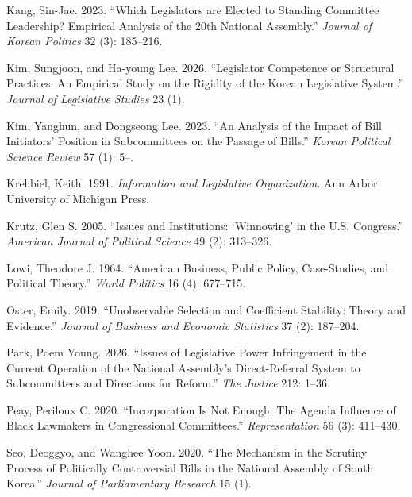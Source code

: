 \documentclass[11pt]{article}
\begin{document}
\begin{description}
\item Kang, Sin-Jae. 2023. ``Which Legislators are Elected to Standing Committee Leadership? Empirical Analysis of the 20th National Assembly.'' \textit{Journal of Korean Politics} 32 (3): 185--216.

\item Kim, Sungjoon, and Ha-young Lee. 2026. ``Legislator Competence or Structural Practices: An Empirical Study on the Rigidity of the Korean Legislative System.'' \textit{Journal of Legislative Studies} 23 (1).

\item Kim, Yanghun, and Dongseong Lee. 2023. ``An Analysis of the Impact of Bill Initiators' Position in Subcommittees on the Passage of Bills.'' \textit{Korean Political Science Review} 57 (1): 5--.

\item Krehbiel, Keith. 1991. \textit{Information and Legislative Organization}. Ann Arbor: University of Michigan Press.

\item Krutz, Glen S. 2005. ``Issues and Institutions: `Winnowing' in the U.S. Congress.'' \textit{American Journal of Political Science} 49 (2): 313--326.

\item Lowi, Theodore J. 1964. ``American Business, Public Policy, Case-Studies, and Political Theory.'' \textit{World Politics} 16 (4): 677--715.

\item Oster, Emily. 2019. ``Unobservable Selection and Coefficient Stability: Theory and Evidence.'' \textit{Journal of Business and Economic Statistics} 37 (2): 187--204.

\item Park, Poem Young. 2026. ``Issues of Legislative Power Infringement in the Current Operation of the National Assembly's Direct-Referral System to Subcommittees and Directions for Reform.'' \textit{The Justice} 212: 1--36.

\item Peay, Periloux C. 2020. ``Incorporation Is Not Enough: The Agenda Influence of Black Lawmakers in Congressional Committees.'' \textit{Representation} 56 (3): 411--430.

\item Seo, Deoggyo, and Wanghee Yoon. 2020. ``The Mechanism in the Scrutiny Process of Politically Controversial Bills in the National Assembly of South Korea.'' \textit{Journal of Parliamentary Research} 15 (1).


\end{description}
\end{document}
